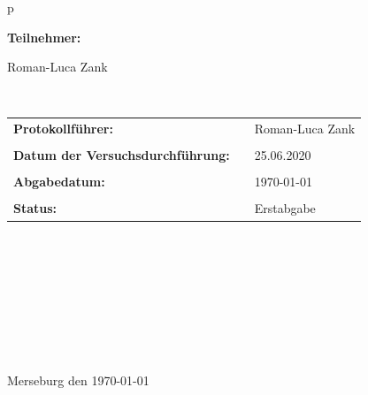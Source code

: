 \begin{center}
\begin{tabular}{p{\textwidth}}
		
		
		\begin{center}
			\Large{\textbf{Teilnehmer:}} \\ 
		\end{center}
		\begin{center}
			\large{Roman-Luca Zank}
		\end{center}
		
		
		\\
		
		\begin{center}
			\begin{tabular}{lll}
				\large{\textbf{Protokollführer:}} & &  \large{Roman-Luca Zank}\\
				&&\\
				\large{\textbf{Datum der Versuchsdurchführung:}}&& \large{25.06.2020}\\
				&&\\
				\large{\textbf{Abgabedatum:}}&& \large{\today}\\
				&&\\
				\large{\textbf{Status:}}&& \large{Erstabgabe}\\
			\end{tabular}
		\end{center}
		
		\\ \\ \\ \\ \\ \\ \\ \\
		\large{Merseburg den \today}
		
	\end{tabular}
\end{center}
